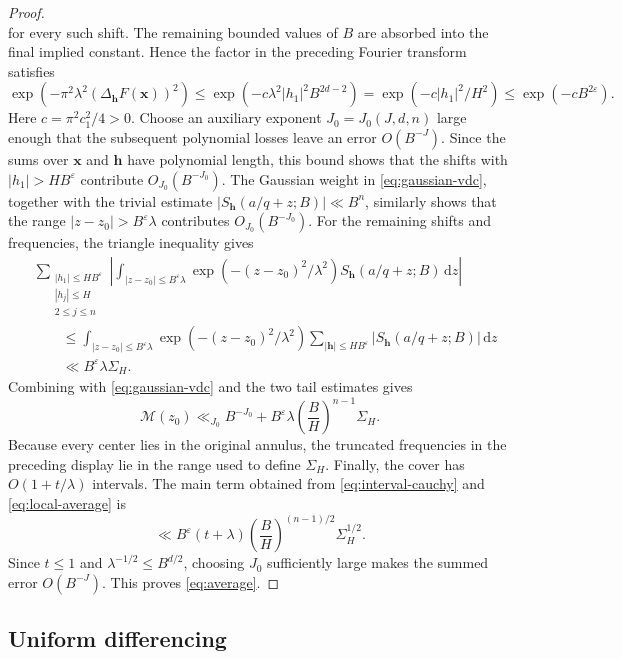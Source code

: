 \documentclass[reqno,a4paper,11pt]{amsart}
\numberwithin{equation}{section}
\newcommand{\x}{\mathbf{x}}
\newcommand{\h}{\mathbf h}
\newcommand{\eps}{\varepsilon}
\newcommand{\dint}{\,\mathrm d}
\theoremstyle{plain}
\theoremstyle{definition}
\begin{document}
\begin{proof}
\[\]
for every such shift.
The remaining bounded values of \(B\) are absorbed into the final implied constant.
Hence the factor in the preceding Fourier transform satisfies
\[
 \exp(-\pi^2\lambda^2(\Delta_\h F(\x))^2)
 \leq\exp(-c\lambda^2|h_1|^2B^{2d-2})
 =\exp(-c|h_1|^2/H^2)
 \leq\exp(-cB^{2\eps}).
\]
Here \(c=\pi^2c_1^2/4>0\).
Choose an auxiliary exponent \(J_0=J_0(J,d,n)\) large enough that the subsequent polynomial losses leave an error \(O(B^{-J})\).
Since the sums over \(\x\) and \(\h\) have polynomial length, this bound shows that the shifts with \(|h_1|>HB^\eps\) contribute \(O_{J_0}(B^{-J_0})\).
The Gaussian weight in \eqref{eq:gaussian-vdc}, together with the trivial estimate \(|S_{\h}(a/q+z;B)|\ll B^n\), similarly shows that the range \(|z-z_0|>B^\eps\lambda\) contributes \(O_{J_0}(B^{-J_0})\).
For the remaining shifts and frequencies, the triangle inequality gives
\begin{equation*}
 \begin{aligned}
 &\sum_{\substack{|h_1|\leq HB^\eps\\
                  |h_j|\leq H\\
                  2\leq j\leq n}}
 \left|\int_{|z-z_0|\leq B^\eps\lambda}
 \exp(-(z-z_0)^2/\lambda^2)
 S_{\h}(a/q+z;B)\dint z\right|\\
 &\qquad\leq
 \int_{|z-z_0|\leq B^\eps\lambda}
 \exp(-(z-z_0)^2/\lambda^2)
 \sum_{|\h|\leq HB^\eps}|S_{\h}(a/q+z;B)|\dint z\\
 &\qquad\ll B^\eps\lambda\Sigma_H.
 \end{aligned}
\end{equation*}
Combining with \eqref{eq:gaussian-vdc} and the two tail estimates gives
\begin{equation}\label{eq:local-average}
 \mathcal M(z_0)
 \ll_{J_0} B^{-J_0}
 +B^\eps\lambda\left(\frac BH\right)^{n-1}\Sigma_H.
\end{equation}
Because every center lies in the original annulus, the truncated frequencies in the preceding display lie in the range used to define \(\Sigma_H\).
Finally, the cover has \(O(1+t/\lambda)\) intervals.
The main term obtained from \eqref{eq:interval-cauchy} and \eqref{eq:local-average} is
\[
 \ll B^\eps(t+\lambda)
 \left(\frac BH\right)^{(n-1)/2}\Sigma_H^{1/2}.
\]
Since \(t\leq1\) and \(\lambda^{-1/2}\leq B^{d/2}\), choosing \(J_0\) sufficiently large makes the summed error \(O(B^{-J})\).
This proves \eqref{eq:average}.
\end{proof}

\subsection{Uniform differencing}
\end{document}
